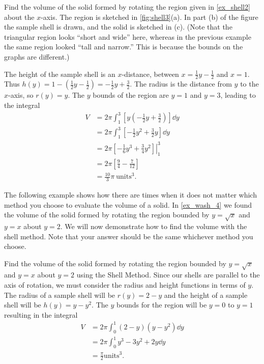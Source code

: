 \begin{example}\label{ex_shell3}
Find the volume of the solid formed by rotating the region given in \autoref{ex_shell2} about the $x$-axis.
\solution
The region is sketched in \autoref{fig:shell3}(a). In part (b) of the figure the sample shell is drawn, and the solid is sketched in (c). (Note that the triangular region looks ``short and wide'' here, whereas in the previous example the same region looked ``tall and narrow.'' This is because the bounds on the graphs are different.)

The height of the sample shell is an $x$-distance, between $x=\frac12y-\frac12$ and $x=1$. Thus $h(y) = 1-(\frac12y-\frac12) = -\frac12y+\frac32.$ The radius is the distance from $y$ to the $x$-axis, so $r(y) =y$. The $y$ bounds of the region are $y=1$ and $y=3$, leading to the integral
\begin{align*}
V &= 2\pi\int_1^3\left[y\left(-\frac12y+\frac32\right)\right]\dd y \\
	&= 2\pi\int_1^3\left[-\frac12y^2+\frac32y\right]\dd y \\
	&= 2\pi\left.\left[-\frac16y^3+\frac34y^2\right]\right|_1^3 \\
	&= 2\pi\left[\frac94-\frac7{12}\right]\\
	&=	\frac{10}{3}\pi %
	\ \text{units}^3.
\end{align*}
\end{example}

The following example shows how there are times when it does not matter which method you choose to evaluate the volume of a solid. In \autoref{ex_wash_4} we found the volume of the solid formed by rotating the region bounded by $y=\sqrt x$ and $y=x$ about $y=2$. We will now demonstrate how to find the volume with the shell method. Note that your answer should be the same whichever method you choose.

\begin{example}\label{ex_shell_wash_eq}
Find the volume of the solid formed by rotating the region bounded by $y=\sqrt x$ and $y=x$ about $y=2$ using the Shell Method.
\solution
Since our shells are parallel to the axis of rotation, we must consider the radius and height functions in terms of $y$. The radius of a sample shell will be $r(y)=2-y$ and the height of a sample shell will be $h(y)=y-y^2$. The $y$ bounds for the region will be $y=0$ to $y=1$ resulting in the integral
\begin{align*}
V&=2\pi \int_0^1 (2-y)(y-y^2)\dd y\\
&=2\pi\int_0^1 y^3-3y^2+2y\dd y\\
&=\frac{\pi}{2} \text{units}^3.
\end{align*}
\end{example}

